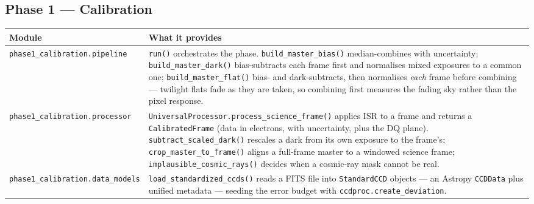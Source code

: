 \documentclass[11pt,a4paper]{article}
\begin{document}
\subsection{Phase 1 --- Calibration}
\begin{center}
\begin{longtable}{|p{3.6cm}|p{10.9cm}|}
\hline
\textbf{Module} & \textbf{What it provides} \\
\hline
\endhead
\texttt{phase1\_calibration.\allowbreak pipeline} & \texttt{run()} orchestrates the phase. \texttt{build\_master\_bias()} median-combines with uncertainty; \texttt{build\_master\_dark()} bias-subtracts each frame first and normalises mixed exposures to a common one; \texttt{build\_master\_flat()} bias- and dark-subtracts, then normalises \emph{each} frame before combining --- twilight flats fade as they are taken, so combining first measures the fading sky rather than the pixel response. \\
\hline
\texttt{phase1\_calibration.\allowbreak processor} & \texttt{UniversalProcessor.process\_science\_frame()} applies ISR to a frame and returns a \texttt{CalibratedFrame} (data in electrons, with uncertainty, plus the DQ plane). \texttt{subtract\_scaled\_dark()} rescales a dark from its own exposure to the frame's; \texttt{crop\_master\_to\_frame()} aligns a full-frame master to a windowed science frame; \texttt{implausible\_cosmic\_rays()} decides when a cosmic-ray mask cannot be real. \\
\hline
\texttt{phase1\_calibration.\allowbreak data\_models} & \texttt{load\_standardized\_ccds()} reads a FITS file into \texttt{StandardCCD} objects --- an Astropy \texttt{CCDData} plus unified metadata --- seeding the error budget with \texttt{ccdproc.create\_deviation}. \\
\hline
\end{longtable}
\end{center}
\end{document}
